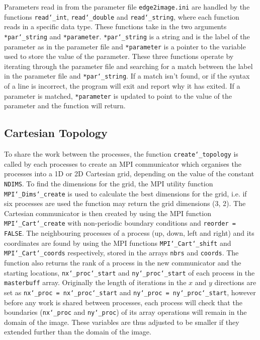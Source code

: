 \documentclass[11pt, a4paper]{article}
\begin{document}
			Parameters read in from the parameter file \texttt{edge2image.ini} are handled by the functions \texttt{read\char`_int}, \texttt{read\char`_double} and \texttt{read\char`_string}, where each function reads in a specific data type. These functions take in the two arguments \texttt{*par\char`_string} and \texttt{*parameter}. \texttt{*par\char`_string} is a string and is the label of the parameter as in the parameter file and \texttt{*parameter} is a pointer to the variable used to store the value of the parameter. These three functions operate by iterating through the parameter file and searching for a match between the label in the parameter file and \texttt{*par\char`_string}. If a match isn't found, or if the syntax of a line is incorrect, the program will exit and report why it has exited. If a parameter is matched, \texttt{*parameter} is updated to point to the value of the parameter and the function will return.
			
	
		\subsection{Cartesian Topology}
			To share the work between the processes, the function \texttt{create\char`_topology} is called by each processes to create an MPI communicator which organises the processes into a 1D or 2D Cartesian grid, depending on the value of the constant \texttt{NDIMS}. To find the dimensions for the grid, the MPI utility function \texttt{MPI\char`_Dims\char`_create} is used to calculate the best dimensions for the grid, i.e. if six processes are used the function may return the grid dimensions  (3, 2). The Cartesian communicator is then created by using the MPI function \texttt{MPI\char`_Cart\char`_create} with non-periodic boundary conditions and \texttt{reorder = FALSE}. The neighbouring processes of a process (up, down, left and right) and its coordinates are found by using the MPI functions \texttt{MPI\char`_Cart\char`_shift} and \texttt{MPI\char`_Cart\char`_coords} respectively, stored in the arrays \texttt{nbrs} and \texttt{coords}. The function also returns the rank of a process in the new communicator and the starting locations, \texttt{nx\char`_proc\char`_start} and \texttt{ny\char`_proc\char`_start} of each process in the \texttt{masterbuff} array. Originally the length of iterations in the $x$ and $y$ directions are set as \texttt{nx\char`_proc = nx\char`_proc\char`_start} and \texttt{ny\char`_proc = ny\char`_proc\char`_start}, however before any work is shared between processes, each process will check that the boundaries (\texttt{nx\char`_proc} and \texttt{ny\char`_proc}) of its array operations will remain in the domain of the image. These variables are thus adjusted to be smaller if they extended further than the domain of the image.
	
\end{document}
